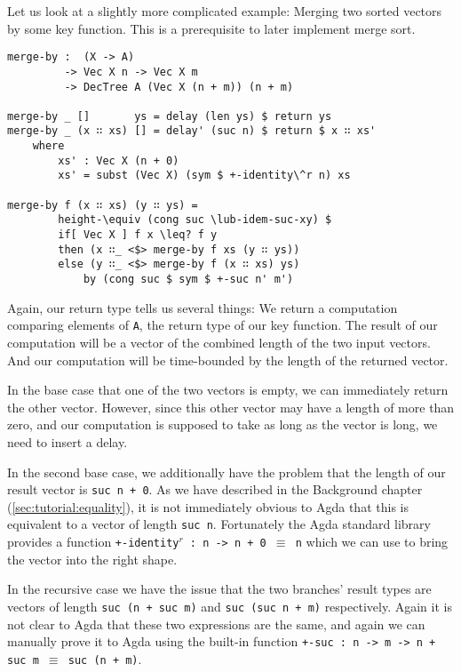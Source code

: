 Let us look at a slightly more complicated example: Merging two sorted vectors by some key function. This is a prerequisite to later implement merge sort.

\begin{lstlisting}[caption={Merging sorted vectors},label={lst:merge},emph={merge,by,DecTree,delay,return,delay',if,then,else}]
merge-by :  (X -> A)
         -> Vec X n -> Vec X m
         -> DecTree A (Vec X (n + m)) (n + m)

merge-by _ []       ys = delay (len ys) $ return ys
merge-by _ (x ∷ xs) [] = delay' (suc n) $ return $ x ∷ xs'
    where
        xs' : Vec X (n + 0)
        xs' = subst (Vec X) (sym $ +-identity\^r n) xs

merge-by f (x ∷ xs) (y ∷ ys) =
        height-\equiv (cong suc \lub-idem-suc-xy) $
        if[ Vec X ] f x \leq? f y
        then (x ∷_ <$> merge-by f xs (y ∷ ys))
        else (y ∷_ <$> merge-by f (x ∷ xs) ys)
            by (cong suc $ sym $ +-suc n' m')
\end{lstlisting}

Again, our return type tells us several things: We return a computation comparing elements of \texttt{A}, the return type of our key function. The result of our computation will be a vector of the combined length of the two input vectors. And our computation will be time-bounded by the length of the returned vector.

In the base case that one of the two vectors is empty, we can immediately return the other vector. However, since this other vector may have a length of more than zero, and our computation is supposed to take as long as the vector is long, we need to insert a delay.

In the second base case, we additionally have the problem that the length of our result vector is \texttt{suc n + 0}. As we have described in the Background chapter (\autoref{sec:tutorial:equality}), it is not immediately obvious to Agda that this is equivalent to a vector of length \texttt{suc n}. Fortunately the Agda standard library provides a function \texttt{+-identity$^r$ : n -> n + 0 $\equiv$ n} which we can use to bring the vector into the right shape.

In the recursive case we have the issue that the two branches' result types are vectors of length \texttt{suc (n + suc m)} and \texttt{suc (suc n + m)} respectively. Again it is not clear to Agda that these two expressions are the same, and again we can manually prove it to Agda using the built-in function \texttt{+-suc : n -> m -> n + suc m $\equiv$ suc (n + m)}.

